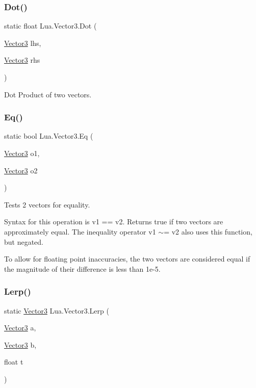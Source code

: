 \subsubsection{\texorpdfstring{Dot()}{Dot()}}
{\footnotesize\ttfamily static float Lua.\+Vector3.\+Dot (\begin{DoxyParamCaption}\item[{\mbox{\hyperlink{class_lua_1_1_vector3}{Vector3}}}]{lhs,  }\item[{\mbox{\hyperlink{class_lua_1_1_vector3}{Vector3}}}]{rhs }\end{DoxyParamCaption})\hspace{0.3cm}{\ttfamily [static]}}



Dot Product of two vectors. 

\mbox{\label{class_lua_1_1_vector3_aaa648399828fb59c6ad750f2f3ad09d6}} 
\subsubsection{\texorpdfstring{Eq()}{Eq()}}
{\footnotesize\ttfamily static bool Lua.\+Vector3.\+Eq (\begin{DoxyParamCaption}\item[{\mbox{\hyperlink{class_lua_1_1_vector3}{Vector3}}}]{o1,  }\item[{\mbox{\hyperlink{class_lua_1_1_vector3}{Vector3}}}]{o2 }\end{DoxyParamCaption})\hspace{0.3cm}{\ttfamily [static]}}



Tests 2 vectors for equality. 

Syntax for this operation is {\ttfamily v1 == v2}. Returns true if two vectors are approximately equal. The inequality operator {\ttfamily v1 $\sim$= v2} also uses this function, but negated.

To allow for floating point inaccuracies, the two vectors are considered equal if the magnitude of their difference is less than 1e-\/5. \mbox{\label{class_lua_1_1_vector3_a2ac180084d2490e519612ccba40da454}} 
\subsubsection{\texorpdfstring{Lerp()}{Lerp()}}
{\footnotesize\ttfamily static \mbox{\hyperlink{class_lua_1_1_vector3}{Vector3}} Lua.\+Vector3.\+Lerp (\begin{DoxyParamCaption}\item[{\mbox{\hyperlink{class_lua_1_1_vector3}{Vector3}}}]{a,  }\item[{\mbox{\hyperlink{class_lua_1_1_vector3}{Vector3}}}]{b,  }\item[{float}]{t }\end{DoxyParamCaption})\hspace{0.3cm}{\ttfamily [static]}}



